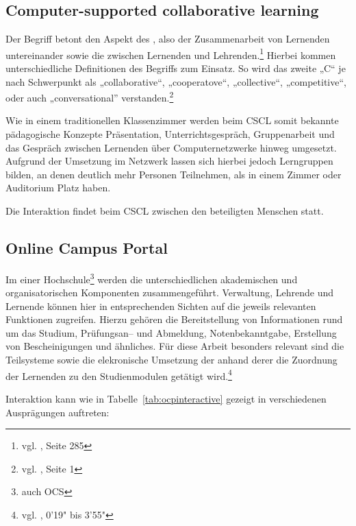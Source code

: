 \subsection{Computer-supported collaborative learning} %
\label{sub:cscl}
Der Begriff  betont den Aspekt des , also der Zusammenarbeit von Lernenden untereinander sowie die zwischen Lernenden und Lehrenden.\footnote{vgl. \cite{euler:boos}, Seite 285} Hierbei kommen unterschiedliche Definitionen des Begriffs zum Einsatz. So wird das zweite „C“ je nach Schwerpunkt als „collaborative“, „cooperatove“, „collective“, „competitive“, oder auch „conversational” verstanden.\footnote{vgl. \cite{csclcomp}, Seite 1} 

Wie in einem traditionellen Klassenzimmer werden beim \ac{CSCL} somit bekannte pädagogische Konzepte Präsentation, Unterrichtsgespräch, Gruppenarbeit und das Gespräch zwischen Lernenden über Computernetzwerke hinweg umgesetzt. Aufgrund der Umsetzung im Netzwerk lassen sich hierbei jedoch Lerngruppen bilden, an denen deutlich mehr Personen Teilnehmen, als in einem Zimmer oder Auditorium Platz haben.

Die Interaktion findet beim \ac{CSCL} zwischen den beteiligten Menschen statt.

\subsection{Online Campus Portal} %
\label{sub:online_campus_portal}
Im  einer Hochschule\footnote{auch \ac{OCS}} werden die unterschiedlichen akademischen und organisatorischen Komponenten zusammengeführt. Verwaltung, Lehrende und Lernende können hier in entsprechenden Sichten auf die jeweils relevanten Funktionen zugreifen. Hierzu gehören die Bereitstellung von Informationen rund um das Studium, Prüfungsan– und Abmeldung, Notenbekanntgabe, Erstellung von Bescheinigungen und ähnliches. Für diese Arbeit besonders relevant sind die Teilsysteme  sowie die elekronische Umsetzung der  anhand derer die Zuordnung der Lernenden zu den Studienmodulen getätigt wird.\footnote{vgl. \cite{akad:campus}, 0'19" bis 3'55"}

Interaktion kann wie in Tabelle~\ref{tab:ocpinteractive} gezeigt in verschiedenen Ausprägungen auftreten:

